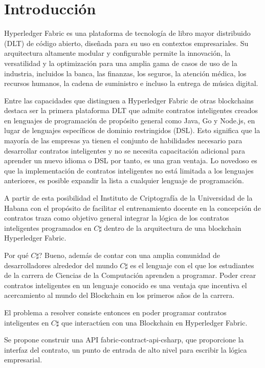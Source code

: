 \chapter*{Introducción}\label{chapter:introduction}

Hyperledger Fabric es una plataforma de tecnología de libro mayor distribuido (DLT) de código abierto, diseñada para su uso en contextos empresariales. Su arquitectura altamente modular y configurable permite la innovación, la versatilidad y la optimización para una amplia gama de casos de uso de la industria, incluidos la banca, las finanzas, los seguros, la atención médica, los recursos humanos, la cadena de suministro e incluso la entrega de música digital.

Entre las capacidades que distinguen a Hyperledger Fabric de otras blockchains destaca ser la primera plataforma DLT que admite contratos inteligentes creados en lenguajes de programación de propósito general como Java, Go y Node.js, en lugar de lenguajes específicos de dominio restringidos (DSL). Esto significa que la mayoría de las empresas ya tienen el conjunto de habilidades necesario para desarrollar contratos inteligentes y no se necesita capacitación adicional para aprender un nuevo idioma o DSL por tanto, es una gran ventaja. Lo novedoso es que la implementación de contratos inteligentes no está limitada a los lenguajes anteriores, es posible expandir la lista a cualquier lenguaje de programación. 

A partir de esta posibilidad el Instituto de Criptografía de la Universidad de la Habana con el propósito de facilitar el entrenamiento docente en la concepción de contratos traza como objetivo general integrar la lógica de los contratos inteligentes programados en $C\sharp$ dentro de la arquitectura de una blockchain Hyperledger Fabric.

Por qué $C \sharp$? Bueno, además de contar con una amplia comunidad de desarrolladores alrededor del mundo $C \sharp$ es el lenguaje con el que los estudiantes de la carrera de Ciencias de la Computación aprenden a programar. Poder crear contratos inteligentes en un lenguaje conocido es una ventaja que incentiva el acercamiento al mundo del Blockchain en los primeros años de la carrera.

El problema a resolver consiste entonces en poder programar contratos inteligentes en $C\sharp$ que interactúen con una Blockchain en Hyperledger Fabric.

Se propone construir una API fabric-contract-api-csharp,  que proporcione la interfaz del contrato, un punto de entrada de alto nivel para escribir la lógica empresarial.

